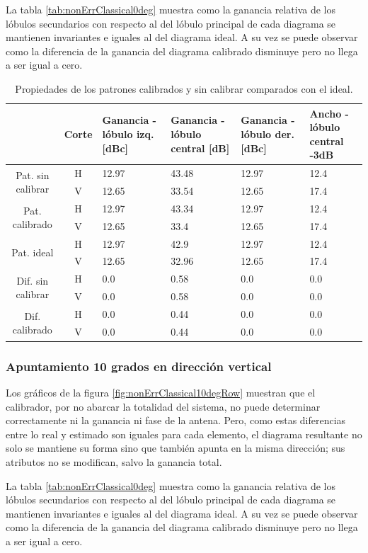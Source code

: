 La tabla \ref{tab:nonErrClassical0deg} muestra como la ganancia relativa de los lóbulos secundarios con respecto al del lóbulo
principal de cada diagrama se mantienen invariantes e iguales al del diagrama ideal. A su vez se puede observar como la diferencia
de la ganancia del diagrama calibrado disminuye pero no llega a ser igual a cero.
\begin{table}[H]
  \footnotesize
  \centering
  \begin{tabular}{|c|c|p{2cm}|p{2.5cm}|p{2.5cm}|p{2.5cm}|}
    \cline{2-6}
    \multicolumn{1}{c|}{} & Corte & Ganancia - lóbulo izq. [dBc] & Ganancia - lóbulo central [dB] &
    Ganancia - lóbulo der. [dBc] & Ancho - lóbulo central -3dB \tabularnewline\hline
    \multirow{2}{2cm}{Pat. sin calibrar} & H & 12.97 & 43.48 & 12.97 & 12.4 \tabularnewline\cline{2-6}
     & V & 12.65 & 33.54 & 12.65 & 17.4 \tabularnewline\hline
    \multirow{2}{2cm}{Pat. calibrado} & H & 12.97 & 43.34 & 12.97 & 12.4 \tabularnewline\cline{2-6}
     & V & 12.65 & 33.4 & 12.65 & 17.4 \tabularnewline\hline
    \multirow{2}{2cm}{Pat. ideal} & H & 12.97 & 42.9 & 12.97 & 12.4 \tabularnewline\cline{2-6}
     & V & 12.65 & 32.96 & 12.65 & 17.4 \tabularnewline\hline
    \multirow{2}{2cm}{Dif. sin calibrar} & H & 0.0 & 0.58 & 0.0 & 0.0\tabularnewline\cline{2-6}
     & V & 0.0 & 0.58 & 0.0 & 0.0 \tabularnewline\hline
    \multirow{2}{2cm}{Dif. calibrado} & H & 0.0 & 0.44 & 0.0 & 0.0 \tabularnewline\cline{2-6}
     & V & 0.0 & 0.44 & 0.0 & 0.0 \tabularnewline\hline
  \end{tabular}
  \caption{Propiedades de los patrones calibrados y sin calibrar comparados con el ideal.}
  \label{tab:nonErrClassical10degCol}
\end{table}


\subsubsection{Apuntamiento 10 grados en dirección vertical}

Los gráficos de la figura \ref{fig:nonErrClassical10degRow} muestran que el calibrador, por no abarcar la totalidad del sistema,
no puede determinar correctamente ni la ganancia ni fase de la antena. Pero, como estas diferencias entre lo real y estimado son
iguales para cada elemento, el diagrama resultante no solo se mantiene su forma sino que también apunta en la misma dirección; 
sus atributos no se modifican, salvo la ganancia total.

La tabla \ref{tab:nonErrClassical0deg} muestra como la ganancia relativa de los lóbulos secundarios con respecto al del lóbulo
principal de cada diagrama se mantienen invariantes e iguales al del diagrama ideal. A su vez se puede observar como la diferencia
de la ganancia del diagrama calibrado disminuye pero no llega a ser igual a cero.


